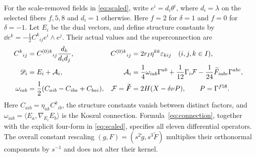 For the scale-removed fields in \eqref{eq:scaled}, write
$e^i=d_i\theta^i$, where $d_i=\lambda$ on the selected fibers $f,5,8$ and $d_i=1$ otherwise. Here $f=2$ for $\delta=1$ and $f=0$ for $\delta=-1$. Let $E_i$ be the dual vectors, and define structure constants by
$\dd e^k=-\tfrac12 C^k{}_{ij}e^i\wedge e^j$. Their actual values and the superconnection are
\begin{equation}\label{eq:connection}
\begin{aligned}
 C^k{}_{ij}&=C^{(0)k}{}_{ij}\frac{d_k}{d_id_j},
 &C^{(0)k}{}_{ij}&=2r_I\eta^{kk}\varepsilon_{kij}
 \quad (i,j,k\in I),\\
 \mathscr D_i&=E_i+\mathcal A_i,
 &\mathcal A_i&=\frac14\omega_{i ab}\Gamma^{ab}
       +\frac1{12}\Gamma_i\mathcal F
       -\frac1{24}\widetilde F_{iabc}\Gamma^{abc},\\
 \omega_{i ab}&=\frac12(C_{aib}-C_{iba}+C_{bai}),
 &\mathcal F=\slashed{\widetilde F}&=2H(X-\delta\nu P),
 \qquad P=\Gamma^{f58}.
\end{aligned}
\end{equation}
Here $C_{aib}=\eta_{ak}C^k{}_{ib}$, the structure constants vanish between distinct factors, and
$\omega_{i ab}=\langle E_a,\nabla_{E_i}E_b\rangle$ is the Koszul connection. Formula~\eqref{eq:connection}, together with the explicit four-form in \eqref{eq:scaled}, specifies all eleven differential operators. The overall constant rescaling $(g,F)=(s^2\widetilde g,s^3\widetilde F)$ multiplies their orthonormal components by $s^{-1}$ and does not alter their kernel.

